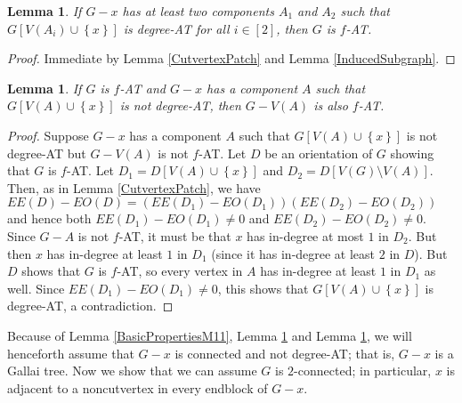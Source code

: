 \documentclass[12pt]{article}
\theoremstyle{plain}
\newtheorem{lem}[thm]{Lemma}
\theoremstyle{definition}
\theoremstyle{remark}
\newcommand{\set}[1]{\left\{ #1 \right\}}
\newcommand{\irange}[1]{\left[#1\right]}
\begin{document}
\begin{lem}\label{DegreeChoosableLobesGood}
	If $G-x$ has at least two components $A_1$ and $A_2$ such that $G[V(A_i) \cup \set{x}]$ is degree-AT for all $i \in \irange{2}$, then $G$ is $f$-AT.
\end{lem}
\begin{proof}
	Immediate by Lemma \ref{CutvertexPatch} and Lemma \ref{InducedSubgraph}.
\end{proof}

\begin{lem}\label{NonDegreeChoosableLobeWorthless}
	If $G$ is $f$-AT and $G-x$ has a component $A$ such that $G[V(A) \cup \set{x}]$ is not degree-AT, then $G - V(A)$ is also $f$-AT.
\end{lem}
\begin{proof}
	 Suppose $G-x$ has a component $A$ such that $G[V(A) \cup \set{x}]$ is not degree-AT but $G - V(A)$ is not $f$-AT. Let $D$ be an orientation of $G$ showing that $G$ is $f$-AT. Let $D_1 = D[V(A) \cup \set{x}]$ and $D_2 = D[V(G)\setminus V(A)]$.  Then, as in Lemma \ref{CutvertexPatch}, we have $EE(D) - EO(D) = (EE(D_1) - EO(D_1))(EE(D_2) - EO(D_2))$ and hence both $EE(D_1) - EO(D_1) \ne 0$ and $EE(D_2) - EO(D_2) \ne 0$.  Since $G - A$ is not $f$-AT, it must be that $x$ has in-degree at most $1$ in $D_2$.  But then $x$ has in-degree at least $1$ in $D_1$ (since it has in-degree at least $2$ in $D$).  But $D$ shows that $G$ is $f$-AT, so every vertex in $A$ has in-degree at least $1$ in $D_1$ as well.  Since $EE(D_1) - EO(D_1) \ne 0$, this shows that $G[V(A) \cup \set{x}]$ is degree-AT, a contradiction.
\end{proof}

Because of Lemma \ref{BasicPropertiesM11}, Lemma \ref{DegreeChoosableLobesGood} and Lemma \ref{NonDegreeChoosableLobeWorthless}, we will henceforth assume that $G-x$ is connected and not degree-AT; that is, $G-x$ is a Gallai tree.  Now we show that we can assume $G$ is $2$-connected; in particular, $x$ is adjacent to a noncutvertex in every endblock of $G-x$.
\end{document}
